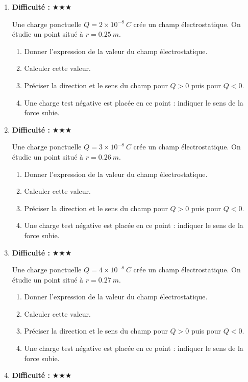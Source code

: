 \documentclass[11pt,a4paper]{article}
\newcommand{\etoiles}[1]{\textbf{Difficulté : }#1}
\begin{document}
\begin{enumerate}[label=\textbf{Exercice \arabic*.},leftmargin=*]
Une charge ponctuelle $Q=1\times10^{-8}\ \si{C}$ crée un champ électrostatique. On étudie un point situé à $r=0.24\ \si{m}$.
\begin{enumerate}[label=\alph*)]
\item Donner l'expression de la valeur du champ électrostatique.
\item Calculer cette valeur.
\item Préciser la direction et le sens du champ pour $Q>0$ puis pour $Q<0$.
\item Une charge test négative est placée en ce point : indiquer le sens de la force subie.
\end{enumerate}
\item \etoiles{★★★}

Une charge ponctuelle $Q=2\times10^{-8}\ \si{C}$ crée un champ électrostatique. On étudie un point situé à $r=0.25\ \si{m}$.
\begin{enumerate}[label=\alph*)]
\item Donner l'expression de la valeur du champ électrostatique.
\item Calculer cette valeur.
\item Préciser la direction et le sens du champ pour $Q>0$ puis pour $Q<0$.
\item Une charge test négative est placée en ce point : indiquer le sens de la force subie.
\end{enumerate}
\item \etoiles{★★★}

Une charge ponctuelle $Q=3\times10^{-8}\ \si{C}$ crée un champ électrostatique. On étudie un point situé à $r=0.26\ \si{m}$.
\begin{enumerate}[label=\alph*)]
\item Donner l'expression de la valeur du champ électrostatique.
\item Calculer cette valeur.
\item Préciser la direction et le sens du champ pour $Q>0$ puis pour $Q<0$.
\item Une charge test négative est placée en ce point : indiquer le sens de la force subie.
\end{enumerate}
\item \etoiles{★★★}

Une charge ponctuelle $Q=4\times10^{-8}\ \si{C}$ crée un champ électrostatique. On étudie un point situé à $r=0.27\ \si{m}$.
\begin{enumerate}[label=\alph*)]
\item Donner l'expression de la valeur du champ électrostatique.
\item Calculer cette valeur.
\item Préciser la direction et le sens du champ pour $Q>0$ puis pour $Q<0$.
\item Une charge test négative est placée en ce point : indiquer le sens de la force subie.
\end{enumerate}
\item \etoiles{★★★}


\end{enumerate}
\end{document}
